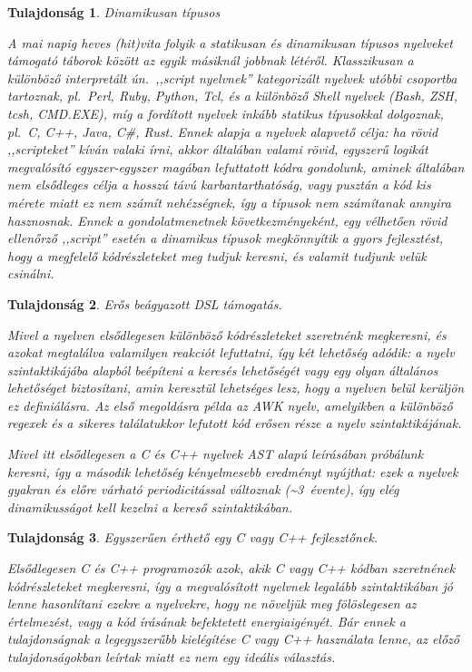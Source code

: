 \documentclass[magyar,12pt,a4paper,final,titlepage]{report}
\newtheorem{property}{Tulajdonság}
\def\pl{pl.\ }
\def\un{ún.\ }
\begin{document}
    \begin{property}\label{prop:dynamic}
        Dinamikusan típusos

        \noindent A mai napig heves (hit)vita folyik a statikusan és dinamikusan típusos nyelveket támogató táborok között az egyik másiknál jobbnak létéről.
        Klasszikusan a különböző interpretált \un ,,script nyelvnek'' kategorizált nyelvek utóbbi csoportba tartoznak, \pl Perl, Ruby, Python, Tcl, és a különböző Shell nyelvek (Bash, ZSH, tcsh, CMD.EXE), míg a fordított nyelvek inkább statikus típusokkal dolgoznak, \pl C, C++, Java, C\#, Rust.
        Ennek alapja a nyelvek alapvető célja: ha rövid ,,scripteket'' kíván valaki írni, akkor általában valami rövid, egyszerű logikát megvalósító egyszer-egyszer magában lefuttatott kódra gondolunk, aminek általában nem elsődleges célja a hosszú távú karbantarthatóság, vagy pusztán a kód kis mérete miatt ez nem számít nehézségnek, így a típusok nem számítanak annyira hasznosnak.
        Ennek a gondolatmenetnek következményeként, egy vélhetően rövid ellenőrző ,,script'' esetén a dinamikus típusok megkönnyítik a gyors fejlesztést, hogy a megfelelő kódrészleteket meg tudjuk keresni, és valamit tudjunk velük csinálni.
    \end{property}

    \begin{property}\label{prop:dsl-friendly}
        Erős beágyazott \gls{DSL} támogatás.

        \noindent Mivel a nyelven elsődlegesen különböző kódrészleteket szeretnénk megkeresni, és azokat megtalálva valamilyen reakciót lefuttatni, így két lehetőség adódik: a nyelv szintaktikájába alapból beépíteni a keresés lehetőségét vagy egy olyan általános lehetőséget biztosítani, amin keresztül lehetséges lesz, hogy a nyelven belül kerüljön ez definiálásra.
        Az első megoldásra példa az AWK nyelv, amelyikben a különböző regexek és a sikeres találatukkor lefutott kód erősen része a nyelv szintaktikájának.

        Mivel itt elsődlegesen a C és C++ nyelvek \gls{AST} alapú leírásában próbálunk keresni, így a második lehetőség kényelmesebb eredményt nyújthat: ezek a nyelvek gyakran és előre várható periodicitással változnak (\textasciitilde 3~évente), így elég dinamikusságot kell kezelni a kereső szintaktikában.
    \end{property}

    \begin{property}\label{prop:easy}
        Egyszerűen érthető egy C vagy C++ fejlesztőnek.

        \noindent Elsődlegesen C és C++ programozók azok, akik C vagy C++ kódban szeretnének kódrészleteket megkeresni, így a megvalósított nyelvnek legalább szintaktikában jó lenne hasonlítani ezekre a nyelvekre, hogy ne növeljük meg fölöslegesen az értelmezést, vagy a
        kód írásának befektetett energiaigényét.
        Bár ennek a tulajdonságnak a legegyszerűbb kielégítése C vagy C++ használata lenne, az előző tulajdonságokban leírtak miatt ez nem egy ideális választás.
    \end{property}
\end{document}
